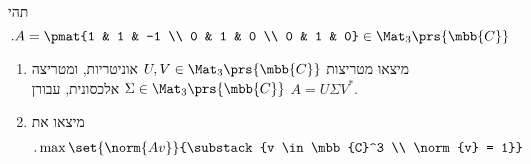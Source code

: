 \documentclass[a4paper,10pt,twoside,openany]{article}
\begin{document}
\begin{exercise}
תהי
\[\text{.} A = \pmat{1 & 1 & -1 \\ 0 &  1 & 0 \\ 0 & 1 & 0} \in \Mat_3\prs{\mbb{C}}\]
\begin{enumerate}

\item מיצאו מטריצות
$U,V \in \Mat_3\prs{\mbb{C}}$
אוניטריות, ומטריצה
$\Sigma \in \Mat_3\prs{\mbb{C}}$
אלכסונית, עבורן
$A = U \Sigma V^*$.

\item
מיצאו את
\begin{align*}
\text{.} \max\set{\norm{Av}}{\substack{v \in \mbb{C}^3 \\ \norm{v} = 1}}
\end{align*}
\end{enumerate}
\end{exercise}
\end{document}
